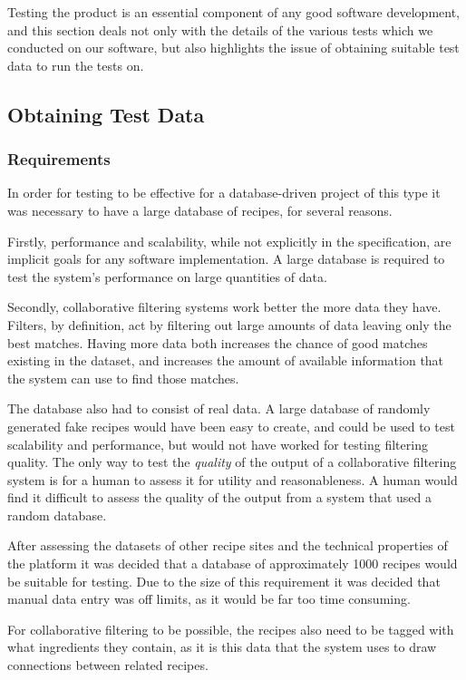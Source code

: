 Testing the product is an essential component of any good software development, and this section deals not only with the
details of the various tests which we conducted on our software, but also highlights the issue of obtaining suitable test
data to run the tests on.

\subsection{Obtaining Test Data}
\subsubsection{Requirements}
In order for testing to be effective for a database-driven project of this type it was necessary to have a large database of recipes, for several reasons.

Firstly, performance and scalability, while not explicitly in the specification, are implicit goals for any software implementation. A large database is required to test the system's performance on large quantities of data.

Secondly, collaborative filtering systems work better the more data they have. Filters, by definition, act by filtering out large amounts of data leaving only the best matches. Having more data both increases the chance of good matches existing in the dataset, and increases the amount of available information that the system can use to find those matches.

The database also had to consist of real data. A large database of randomly generated fake recipes would have been easy to create, and could be used to test scalability and performance, but would not have worked for testing filtering quality. The only way to test the \textit{quality} of the output of a collaborative filtering system is for a human to assess it for utility and reasonableness. A human would find it difficult to assess the quality of the output from a system that used a random database.

After assessing the datasets of other recipe sites and the technical properties of the platform it was decided that a database of approximately 1000 recipes would be suitable for testing. Due to the size of this requirement it was decided that manual data entry was off limits, as it would be far too time consuming.

For collaborative filtering to be possible, the recipes also need to be tagged with what ingredients they contain, as it is this data that the system uses to draw connections between related recipes.

